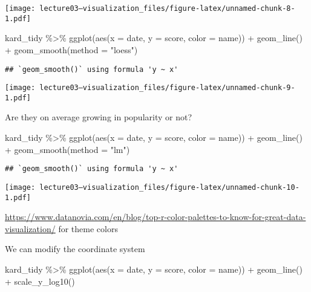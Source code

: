\documentclass[
]{article}
\newenvironment{Shaded}{\begin{snugshade}}{\end{snugshade}}
\newcommand{\AttributeTok}[1]{\textcolor[rgb]{0.77,0.63,0.00}{#1}}
\newcommand{\FunctionTok}[1]{\textcolor[rgb]{0.00,0.00,0.00}{#1}}
\newcommand{\NormalTok}[1]{#1}
\newcommand{\SpecialCharTok}[1]{\textcolor[rgb]{0.00,0.00,0.00}{#1}}
\newcommand{\StringTok}[1]{\textcolor[rgb]{0.31,0.60,0.02}{#1}}
\begin{document}
\texttt{[image: lecture03---visualization\_files/figure-latex/unnamed-chunk-8-1.pdf]}

\begin{Shaded}
\begin{Highlighting}[]
\NormalTok{kard\_tidy }\SpecialCharTok{\%\textgreater{}\%} 
  \FunctionTok{ggplot}\NormalTok{(}\FunctionTok{aes}\NormalTok{(}\AttributeTok{x =}\NormalTok{ date, }\AttributeTok{y =}\NormalTok{ score, }\AttributeTok{color =}\NormalTok{ name)) }\SpecialCharTok{+}
  \FunctionTok{geom\_line}\NormalTok{() }\SpecialCharTok{+} 
  \FunctionTok{geom\_smooth}\NormalTok{(}\AttributeTok{method =} \StringTok{"loess"}\NormalTok{)}
\end{Highlighting}
\end{Shaded}

\begin{verbatim}
## `geom_smooth()` using formula 'y ~ x'
\end{verbatim}

\texttt{[image: lecture03---visualization\_files/figure-latex/unnamed-chunk-9-1.pdf]}

Are they on average growing in popularity or not?

\begin{Shaded}
\begin{Highlighting}[]
\NormalTok{kard\_tidy }\SpecialCharTok{\%\textgreater{}\%} 
  \FunctionTok{ggplot}\NormalTok{(}\FunctionTok{aes}\NormalTok{(}\AttributeTok{x =}\NormalTok{ date, }\AttributeTok{y =}\NormalTok{ score, }\AttributeTok{color =}\NormalTok{ name)) }\SpecialCharTok{+}
  \FunctionTok{geom\_line}\NormalTok{() }\SpecialCharTok{+} 
  \FunctionTok{geom\_smooth}\NormalTok{(}\AttributeTok{method =} \StringTok{"lm"}\NormalTok{)}
\end{Highlighting}
\end{Shaded}

\begin{verbatim}
## `geom_smooth()` using formula 'y ~ x'
\end{verbatim}

\texttt{[image: lecture03---visualization\_files/figure-latex/unnamed-chunk-10-1.pdf]}

\url{https://www.datanovia.com/en/blog/top-r-color-palettes-to-know-for-great-data-visualization/}
for theme colors

We can modify the coordinate system

\begin{Shaded}
\begin{Highlighting}[]
\NormalTok{kard\_tidy }\SpecialCharTok{\%\textgreater{}\%} 
  \FunctionTok{ggplot}\NormalTok{(}\FunctionTok{aes}\NormalTok{(}\AttributeTok{x =}\NormalTok{ date, }\AttributeTok{y =}\NormalTok{ score, }\AttributeTok{color =}\NormalTok{ name)) }\SpecialCharTok{+}
  \FunctionTok{geom\_line}\NormalTok{() }\SpecialCharTok{+}
  \FunctionTok{scale\_y\_log10}\NormalTok{()}
\end{Highlighting}
\end{Shaded}
\end{document}

